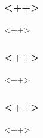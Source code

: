 
\begin{frame}[<+ctb!+>]
    \frametitle{<++>}
  \end{frame}<++>
\begin{frame}[<+ctb!+>]
    \frametitle{<++>}
  \end{frame}<++>
\begin{frame}[<+ctb!+>]
    \frametitle{<++>}
  \end{frame}<++>
